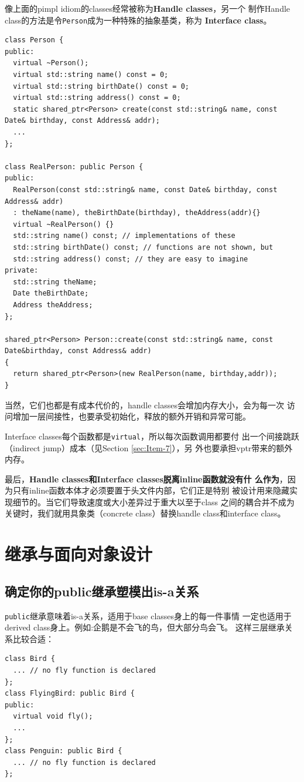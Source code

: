 像上面的pimpl idiom的classes经常被称为\textbf{Handle classes}，另一个
制作Handle class的方法是令\texttt{Person}成为一种特殊的抽象基类，称为
\textbf{Interface class}。
\begin{verbatim}
class Person {
public:
  virtual ~Person();
  virtual std::string name() const = 0;
  virtual std::string birthDate() const = 0;
  virtual std::string address() const = 0;
  static shared_ptr<Person> create(const std::string& name, const Date& birthday, const Address& addr); 
  ...
};

class RealPerson: public Person {
public:
  RealPerson(const std::string& name, const Date& birthday, const Address& addr)
  : theName(name), theBirthDate(birthday), theAddress(addr){}
  virtual ~RealPerson() {}
  std::string name() const; // implementations of these
  std::string birthDate() const; // functions are not shown, but
  std::string address() const; // they are easy to imagine
private:
  std::string theName;
  Date theBirthDate;
  Address theAddress;
};

shared_ptr<Person> Person::create(const std::string& name, const Date&birthday, const Address& addr)
{
  return shared_ptr<Person>(new RealPerson(name, birthday,addr));
}
\end{verbatim}

当然，它们也都是有成本代价的，handle classes会增加内存大小，会为每一次
访问增加一层间接性，也要承受初始化，释放的额外开销和异常可能。

Interface classes每个函数都是\texttt{virtual}，所以每次函数调用都要付
出一个间接跳跃（indirect jump）成本（见Section \ref{sec:Item-7}），另
外也要承担vptr带来的额外内存。

最后，\textbf{Handle classes和Interface classes脱离inline函数就没有什
  么作为}，因为只有inline函数本体才必须要置于头文件内部，它们正是特别
被设计用来隐藏实现细节的。当它们导致速度或大小差异过于重大以至于class
之间的耦合并不成为关键时，我们就用具象类（concrete class）替换handle
class和interface class。

\clearpage
\section{继承与面向对象设计}

\subsection{确定你的public继承塑模出is-a关系}
\label{sec:Item-32}

\texttt{public}继承意味着is-a关系，适用于base classes身上的每一件事情
一定也适用于derived class身上。例如:企鹅是不会飞的鸟，但大部分鸟会飞。
这样三层继承关系比较合适：
\begin{verbatim}
class Bird {
  ... // no fly function is declared
};
class FlyingBird: public Bird {
public:
  virtual void fly();
  ...
};
class Penguin: public Bird {
  ... // no fly function is declared
};
\end{verbatim}

